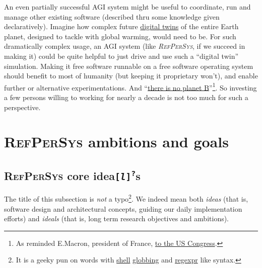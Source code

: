 \documentclass[11pt,a4paper,svgnames]{article}
\newcommand{\RefPerSys}{{\textit{\textsc{RefPerSys}}}}
\begin{document}
An even partially successful \textsc{AGI} system might be useful to
coordinate, run and manage other existing software (described thru
some knowledge given declaratively). Imagine how complex future
\href{https://en.wikipedia.org/wiki/Digital_twin}{digital twins} of
the entire Earth planet, designed to tackle with global warming, would
need to be. For such dramatically complex usage, an AGI system (like
{\RefPerSys}, if we succeed in making it) could be quite helpful to
just drive and use such a ``digital twin'' simulation. Making it free
software runnable on a free software operating system should benefit
to most of humanity (but keeping it proprietary won't), and enable
further or alternative experimentations. And
``\href{https://theresnoplanetb.net/}{there is no planet
  B}''\footnote{As reminded E.Macron, president of France,
  \href{https://www.bbc.com/news/av/world-us-canada-43900009/macron-to-us-congress-there-is-no-planet-b}{to
    the US Congress}.}. So investing a few persons willing to working
for nearly a decade is not too much for such a perspective.


\section{\textsc{RefPerSys} ambitions and goals}
\label{sec:ambitions-goals}


\subsection{\textsc{RefPerSys} core idea{\texttt{[\textit{l}]\textsuperscript{?}}}s}
\label{subsec:coreidea}

The title of this subsection is \emph{not} a typo\footnote{It is a
geeky pun on words with
\href{https://en.wikipedia.org/wiki/Unix_shell}{shell}
\href{https://en.wikipedia.org/wiki/Glob_(programming)}{globbing} and
\href{https://en.wikipedia.org/wiki/Regular\_expression}{regexpr} like
syntax.}. We indeed mean both \textit{ideas} (that is, software design
and architectural concepts, guiding our daily implementation efforts)
and \textit{ideals} (that is, long term research objectives and
ambitions).
\end{document}
